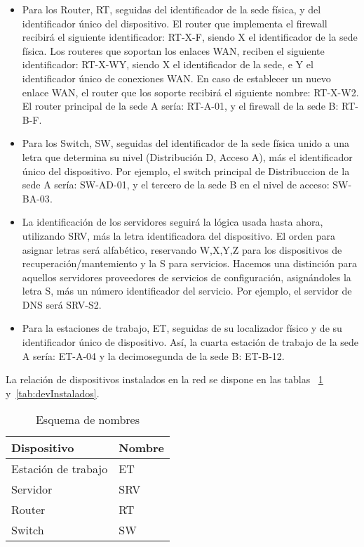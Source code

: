 \documentclass[a4paper,onecolumn,11pt]{article}
\begin{document}
\begin{itemize}

\item Para los Router, \textsf{RT}, seguidas del identificador de la sede física, y del identificador único del dispositivo. 
El router que implementa el firewall recibirá el siguiente identificador: \textsf{RT-X-F}, siendo \textsf{X} el identificador de la sede física. Los routeres que soportan los enlaces WAN, reciben el siguiente identificador: \textsf{RT-X-WY}, siendo \textsf{X} el identificador de la sede, e \textsf{Y} el identificador único de conexiones WAN. En caso de establecer un nuevo enlace WAN, el router que los soporte recibirá el siguiente nombre: \textsf{RT-X-W2}. El router principal de la sede A sería: \textsf{RT-A-01}, y el firewall de la sede B: \textsf{RT-B-F}.

\item Para los Switch, \textsf{SW}, seguidas del identificador de la sede física unido a una letra que determina su nivel (Distribución D, Acceso A), más el
identificador único del dispositivo. Por ejemplo, el switch principal de Distribuccion de la sede A sería: \textsf{SW-AD-01}, y el tercero de la sede B en el nivel de acceso: \textsf{SW-BA-03}.

\item La identificación de los servidores seguirá la lógica usada hasta ahora, utilizando \textsf{SRV}, más la letra identificadora del dispositivo. El orden para asignar letras
será alfabético, reservando \textsf{W,X,Y,Z} para los dispositivos de recuperación/mantemiento y la \textsf{S} para servicios.
Hacemos una distinción para aquellos servidores proveedores de servicios de configuración, asignándoles la letra \textsf{S}, más un número identificador del servicio. Por ejemplo, el servidor de DNS será \textsf{SRV-S2}.

\item Para la estaciones de trabajo, \textsf{ET}, seguidas de su localizador físico y de su identificador único de dispositivo. Así, la cuarta estación de trabajo de la sede A sería: \textsf{ET-A-04} y la decimosegunda de la sede B: \textsf{ET-B-12}.
\end{itemize}
La relación de dispositivos instalados en la red se dispone en las tablas ~\ref{tab:esquemaNombres} y~\ref{tab:devInstalados}.

\begin{table}[htbp]
\small \sffamily
\caption{Esquema de nombres}
\begin{center}
\begin{tabular}{p{}p{}}
\toprule
\textbf{Dispositivo} & \textbf{Nombre}\\
\toprule

Estación de trabajo & ET \\\midrule
Servidor &	SRV \\\midrule
Router & RT \\\midrule
Switch & SW\\
\bottomrule

\end{tabular}
\end{center}
\label{tab:esquemaNombres}
\end{table}
\end{document}
